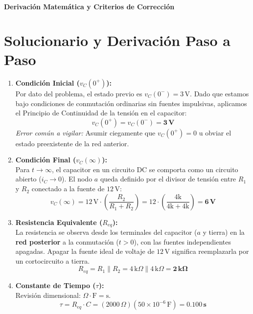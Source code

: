 \documentclass[11pt, a4paper]{article}
\begin{document}
\begin{tcolorbox}[colback=ucbblue!5!white, colframe=ucbblue, title=\textbf{Clave Docente: Diagnóstico Individual RC (Segmento 1)}]
    \centering \textbf{Derivación Matemática y Criterios de Corrección}
\end{tcolorbox}

\section*{Solucionario y Derivación Paso a Paso}

\begin{enumerate}
    \item \textbf{Condición Inicial ($v_C(0^+)$):} \\
    Por dato del problema, el estado previo es $v_C(0^-) = 3\,\text{V}$. Dado que estamos bajo condiciones de conmutación ordinarias sin fuentes impulsivas, aplicamos el Principio de Continuidad de la tensión en el capacitor:
    $$v_C(0^+) = v_C(0^-) = \mathbf{3\,\text{V}}$$
    \textit{Error común a vigilar:} Asumir ciegamente que $v_C(0^+)=0$ u obviar el estado preexistente de la red anterior.
    
    \item \textbf{Condición Final ($v_C(\infty)$):} \\
    Para $t \to \infty$, el capacitor en un circuito DC se comporta como un circuito abierto ($i_C \to 0$). El nodo $a$ queda definido por el divisor de tensión entre $R_1$ y $R_2$ conectado a la fuente de $12\,\text{V}$:
    $$v_C(\infty) = 12\,\text{V} \cdot \left( \frac{R_2}{R_1 + R_2} \right) = 12 \cdot \left( \frac{4\text{k}}{4\text{k} + 4\text{k}} \right) = \mathbf{6\,\text{V}}$$
    
    \item \textbf{Resistencia Equivalente ($R_{eq}$):} \\
    La resistencia se observa desde los terminales del capacitor ($a$ y tierra) en la \textbf{red posterior} a la conmutación ($t > 0$), con las fuentes independientes apagadas. Apagar la fuente ideal de voltaje de $12\,\text{V}$ significa reemplazarla por un cortocircuito a tierra.
    $$R_{eq} = R_1 \parallel R_2 = 4\,\text{k}\Omega \parallel 4\,\text{k}\Omega = \mathbf{2\,\text{k}\Omega}$$
    
    \item \textbf{Constante de Tiempo ($\tau$):} \\
    Revisión dimensional: $\Omega \cdot \text{F} = \text{s}$.
    $$\tau = R_{eq} \cdot C = (2000\,\Omega)(50 \times 10^{-6}\,\text{F}) = \mathbf{0.100\,\text{s}}$$
    

\end{enumerate}
\end{document}
